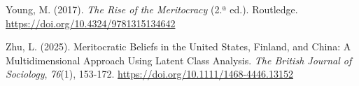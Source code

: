 \documentclass[
  spanish,
  a4paper,
  oneside]{scrbook}
\newlength{\cslhangindent}
\newenvironment{CSLReferences}[2] %
 {\begin{list}{}{%
  \setlength{\itemindent}{0pt}
  \setlength{\leftmargin}{0pt}
  \setlength{\parsep}{0pt}
  \ifodd #1
   \setlength{\leftmargin}{\cslhangindent}
   \setlength{\itemindent}{-1\cslhangindent}
  \fi
  \setlength{\itemsep}{#2\baselineskip}}}
 {\end{list}}
\begin{document}
\begin{CSLReferences}{1}{0}
Young, M. (2017). \emph{The Rise of the Meritocracy} (2.ª ed.).
Routledge. \url{https://doi.org/10.4324/9781315134642}

Zhu, L. (2025). Meritocratic Beliefs in the United States, Finland, and
China: A Multidimensional Approach Using Latent Class Analysis.
\emph{The British Journal of Sociology}, \emph{76}(1), 153-172.
\url{https://doi.org/10.1111/1468-4446.13152}

\end{CSLReferences}


\backmatter

\mainmatter
\pagestyle{scrheadings}

\end{document}

